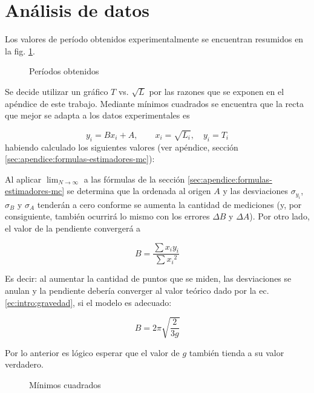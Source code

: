 \section{Análisis de datos}

Los valores de período obtenidos experimentalmente se encuentran resumidos en
la fig. \ref{fig:datos:periodos}.

\begin{figure}[H]
    \centering
    
    \caption{Períodos obtenidos}
    \label{fig:datos:periodos}
\end{figure}

Se decide utilizar un gráfico $T$ vs. $\sqrt{L}$ por las razones que se 
exponen en el apéndice de este trabajo. Mediante mínimos cuadrados se encuentra
que la recta que mejor se adapta a los datos experimentales es

\[
    y_i = Bx_i + A, \quad\quad x_i = \sqrt{L_i}, \quad y_i = T_i
\]
habiendo calculado los siguientes valores (ver apéndice, sección 
\ref{sec:apendice:formulas-estimadores-mc}):

\begin{itemize}
    
\end{itemize}


Al aplicar $\lim_{N\to\infty}$ a las fórmulas de la sección
\ref{sec:apendice:formulas-estimadores-mc} se determina que la ordenada al
origen $A$ y las desviaciones $\sigma_{y_i}$, $\sigma_B$ y $\sigma_A$ tenderán
a cero conforme se aumenta la cantidad de mediciones (y, por consiguiente,
también ocurrirá lo mismo con los errores $\Delta B$ y $\Delta A$). Por otro
lado, el valor de la pendiente convergerá a

\[
    B = \frac{ \sum{x_i y_i} }{ \sum {x_i}^2 }
\]

Es decir: al aumentar la cantidad de puntos que se miden, las desviaciones se
anulan y la pendiente debería converger al valor teórico dado por la ec.
\ref{ec:intro:gravedad}, si el modelo es adecuado:

\[
    B = 2\pi \sqrt{\frac{2}{3g}}
\]

Por lo anterior es lógico esperar que el valor de $g$ también tienda a su valor
verdadero.


\begin{figure}[H]
    \centering
    
    \caption{Mínimos cuadrados}
    \label{fig:datos:regresion}
\end{figure}

